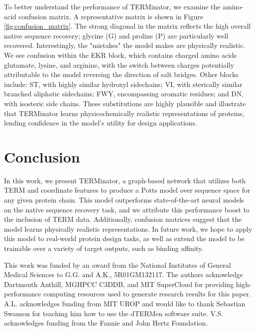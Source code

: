 \documentclass{article}
\begin{document}
To better understand the performance of TERMinator, we examine the amino-acid confusion matrix. A representative matrix is shown in Figure \ref{fig:confusion_matrix}. The strong diagonal in the matrix reflects the high overall native sequence recovery; glycine (G) and proline (P) are particularly well recovered. Interestingly, the "mistakes" the model makes are physically realistic. We see confusion within the EKR block, which contains charged amino acids glutamate, lysine, and arginine, with the switch between charges potentially attributable to the model reversing the direction of salt bridges. Other blocks include: ST, with highly similar hydroxyl sidechains; VI, with sterically similar branched aliphatic sidechains; FWY, encompassing aromatic residues; and DN, with isosteric side chains. These substitutions are highly plausible and illustrate that TERMinator learns physicochemically realistic representations of proteins, lending confidence in the model's utility for design applications.



\section{Conclusion}

In this work, we present TERMinator, a graph-based network that utilizes both TERM and coordinate features to produce a Potts model over sequence space for any given protein chain. This model outperforms state-of-the-art neural models on the native sequence recovery task, and we attribute this performance boost to the inclusion of TERM data. Additionally, confusion matrices suggest that the model learns physically realistic representations. In future work, we hope to apply this model to real-world protein design tasks, as well as extend the model to be trainable over a variety of target outputs, such as binding affinity.

\begin{ack}
This work was funded by an award from the National Institutes of General Medical Sciences to G.G. and A.K., 5R01GM132117. The authors acknowledge Dartmouth Anthill, MGHPCC C3DDB, and MIT SuperCloud for providing high-performance computing resources used to generate research results for this paper. A.L. acknowledges funding from MIT UROP and would like to thank Sebastian Swanson for teaching him how to use the dTERMen software suite. V.S. acknowledges funding from the Fannie and John Hertz Foundation. 
\end{ack}
\end{document}
